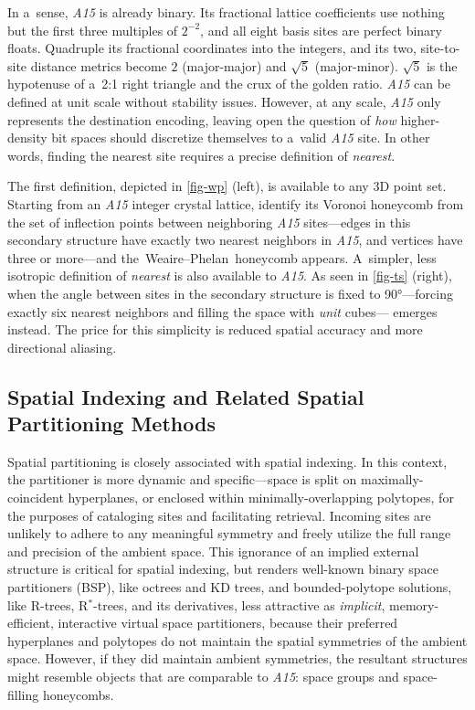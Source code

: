 \documentclass[10pt]{article}
\def\AAAB{\textit{A15}}
\def\tWPh{the~Weaire--Phelan~honeycomb}
\begin{document}
In a~sense, \AAAB{} is already binary. Its fractional lattice coefficients use nothing but the first three multiples of $2^{-2}$,
and all eight basis sites are perfect binary floats. Quadruple its fractional coordinates into the integers, and its two,
site-to-site distance metrics become $2$ (major-major) and $\sqrt{5}$ (major-minor). $\sqrt{5}$ is the hypotenuse of a~2:1 right
triangle and the crux of the golden ratio. \AAAB{} can be defined at unit scale without stability issues. However, at any scale,
\AAAB{} only represents the destination encoding, leaving open the question of \emph{how} higher-density bit spaces should
discretize themselves to a~valid \AAAB{} site. In other words, finding the nearest site requires a precise definition of
\emph{nearest}.

The first definition, depicted in \autoref{fig-wp} (left), is available to any 3D point set. Starting from an \AAAB{} integer
crystal lattice, identify its Voronoi honeycomb from the set of inflection points between neighboring \AAAB{} sites---edges in
this secondary structure have exactly two nearest neighbors in \AAAB{}, and vertices have three or more---and \tWPh{} appears.
A~simpler, less isotropic definition of \emph{nearest} is also available to \AAAB{}. As seen in \autoref{fig-ts} (right), when
the angle between sites in the secondary structure is fixed to 90°---forcing exactly six nearest neighbors and filling the space
with \emph{unit} cubes---\tTSp{} emerges instead. The price for this simplicity is reduced spatial accuracy and more directional
aliasing.

\subsection{ Spatial Indexing and Related Spatial Partitioning Methods
}\label{spatial-indexing-and-related-spatial-partitioning-methods}

Spatial partitioning is closely associated with spatial indexing. In this context, the partitioner is more dynamic and
specific---space is split on maximally-coincident hyperplanes, or enclosed within minimally-overlapping polytopes, for the
purposes of cataloging sites and facilitating retrieval. Incoming sites are unlikely to adhere to any meaningful symmetry and
freely utilize the full range and precision of the ambient space. This ignorance of an implied external structure is critical for
spatial indexing, but renders well-known binary space partitioners (BSP), like octrees and KD trees, and bounded-polytope
solutions, like R-trees, R$^*$-trees, and its derivatives, less attractive as \emph{implicit}, memory-efficient, interactive
virtual space partitioners, because their preferred hyperplanes and polytopes do not maintain the spatial symmetries of the
ambient space. However, if they did maintain ambient symmetries, the resultant structures might resemble objects that are
comparable to \AAAB{}: space groups and space-filling honeycombs.
\end{document}
